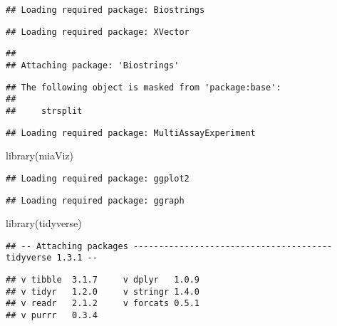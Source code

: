 \documentclass[
  oneside]{book}
\newenvironment{Shaded}{\begin{snugshade}}{\end{snugshade}}
\newcommand{\FunctionTok}[1]{\textcolor[rgb]{0.00,0.00,0.00}{#1}}
\newcommand{\NormalTok}[1]{#1}
\begin{document}
\begin{verbatim}
## Loading required package: Biostrings
\end{verbatim}

\begin{verbatim}
## Loading required package: XVector
\end{verbatim}

\begin{verbatim}
## 
## Attaching package: 'Biostrings'
\end{verbatim}

\begin{verbatim}
## The following object is masked from 'package:base':
## 
##     strsplit
\end{verbatim}

\begin{verbatim}
## Loading required package: MultiAssayExperiment
\end{verbatim}

\begin{Shaded}
\begin{Highlighting}[]
\FunctionTok{library}\NormalTok{(miaViz)}
\end{Highlighting}
\end{Shaded}

\begin{verbatim}
## Loading required package: ggplot2
\end{verbatim}

\begin{verbatim}
## Loading required package: ggraph
\end{verbatim}

\begin{Shaded}
\begin{Highlighting}[]
\FunctionTok{library}\NormalTok{(tidyverse)}
\end{Highlighting}
\end{Shaded}

\begin{verbatim}
## -- Attaching packages --------------------------------------- tidyverse 1.3.1 --
\end{verbatim}

\begin{verbatim}
## v tibble  3.1.7     v dplyr   1.0.9
## v tidyr   1.2.0     v stringr 1.4.0
## v readr   2.1.2     v forcats 0.5.1
## v purrr   0.3.4
\end{verbatim}
\end{document}
